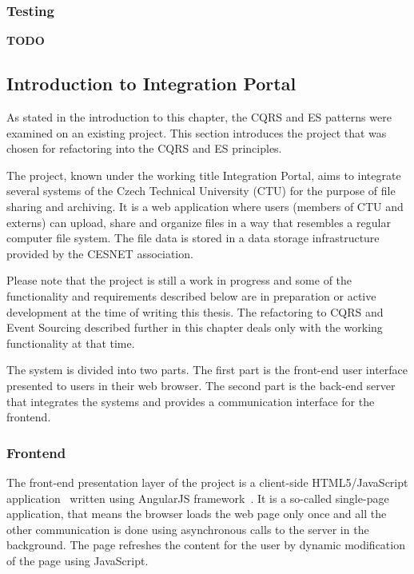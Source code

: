 \documentclass{book}
\begin{document}
\subsubsection{Testing}\label{testing}

\textbf{TODO}


\subsection{Introduction to Integration
Portal}\label{introduction-to-integration-portal}

As stated in the introduction to this chapter, the CQRS and ES patterns
were examined on an existing project. This section introduces the
project that was chosen for refactoring into the CQRS and ES principles.

The project, known under the working title Integration Portal, aims to
integrate several systems of the Czech Technical University (CTU) for
the purpose of file sharing and archiving. It is a web application where
users (members of CTU and externs) can upload, share and organize files
in a way that resembles a regular computer file system. The file data is
stored in a data storage infrastructure provided by the CESNET
association.

Please note that the project is still a work in progress and some of the
functionality and requirements described below are in preparation or
active development at the time of writing this thesis. The refactoring
to CQRS and Event Sourcing described further in this chapter deals only
with the working functionality at that time.

The system is divided into two parts. The first part is the front-end
user interface presented to users in their web browser. The second part
is the back-end server that integrates the systems and provides a
communication interface for the frontend.

\subsubsection{Frontend}\label{frontend}

The front-end presentation layer of the project is a client-side
HTML5/JavaScript application~\cite{frontend} written using AngularJS
framework~\cite{angular}. It is a so-called single-page application,
that means the browser loads the web page only once and all the other
communication is done using asynchronous calls to the server in the
background. The page refreshes the content for the user by dynamic
modification of the page using JavaScript.
\end{document}
